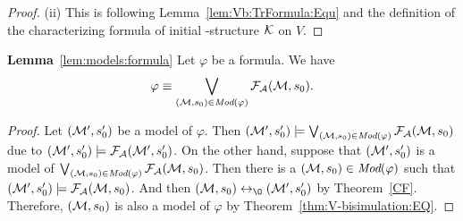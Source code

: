 \documentclass[letterpaper]{article} %
\begin{document}
\begin{proof}
(ii) This is following Lemma~\ref{lem:Vb:TrFormula:Equ} and the definition of the characterizing formula of initial \MPK-structure ${\cal K}$ on $V$.

\end{proof}


\noindent\textbf{Lemma}~\ref{lem:models:formula} Let $\varphi$ be a formula. We have
  \begin{equation}
    \varphi\equiv \bigvee_{({\cal M}, s_0)\in\textit{Mod}(\varphi)}{\cal F}_{\cal A}({\cal M}, s_0).
    \end{equation}
\begin{proof}
Let $({\cal M}', s_0')$ be a model of $\varphi$. Then $({\cal M}', s_0') \models \bigvee_{({\cal M}, s_0)\in \textit{Mod}(\varphi)} {\cal F}_{{\cal A}}({\cal M}, s_0)$ due to $({\cal M}', s_0') \models {\cal F}_{{\cal A}}({\cal M}', s_0')$. On the other hand, suppose that $({\cal M}', s_0')$ is a model of $\bigvee_{({\cal M}, s_0)\in \textit{Mod}(\varphi)} {\cal F}_{{\cal A}}({\cal M}, s_0)$. Then there is a $({\cal M}, s_0)\in \textit{Mod}(\varphi)$ such that $({\cal M}', s_0') \models {\cal F}_{{\cal A}}({\cal M}, s_0)$. And then $(\Hm, s_0) \lrto_{\O} (\Hm', s_0')$ by Theorem~\ref{CF}. Therefore, $({\cal M}, s_0)$ is also a model of $\varphi$ by Theorem~\ref{thm:V-bisimulation:EQ}.
\end{proof}

\end{document}
